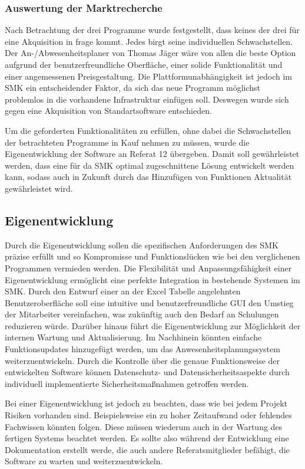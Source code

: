 \subsubsection{Auswertung der Marktrecherche}
\label{sec:AuswertungMarktrecherche}
Nach Betrachtung der drei Programme wurde festgestellt, dass keines der drei für eine Akquisition in frage kommt. Jedes birgt seine individuellen Schwachstellen. Der An-/Abwesenheitsplaner von Thomas Jäger wäre von allen die beste Option aufgrund der benutzerfreundliche Oberfläche, einer solide Funktionalität und einer angemessenen Preisgestaltung. Die Plattformunabhängigkeit ist jedoch im SMK ein entscheidender Faktor, da sich das neue Programm möglichst problemlos in die vorhandene Infrastruktur einfügen soll. Deswegen wurde sich gegen eine Akquisition von Standartsoftware entschieden.

Um die geforderten Funktionalitäten zu erfüllen, ohne dabei die Schwachstellen der betrachteten Programme in Kauf nehmen zu müssen, wurde die Eigenentwicklung der Software an Referat 12 übergeben. Damit soll gewährleistet werden, dass eine für da SMK optimal zugeschnittene Lösung entwickelt werden kann, sodass auch in Zukunft durch das Hinzufügen von Funktionen Aktualität gewährleistet wird.

\subsection{Eigenentwicklung}
\label{sec:Eigenentwicklung}

Durch die Eigenentwicklung sollen die spezifischen Anforderungen des SMK präzise erfüllt und so Kompromisse und Funktionslücken wie bei den verglichenen Programmen vermieden werden. Die Flexibilität und Anpassungsfähigkeit einer Eigenentwicklung ermöglicht eine perfekte Integration in bestehende Systemen im SMK. Durch den Entwurf einer an der Excel Tabelle angelehnten Benutzeroberfläche soll eine intuitive und benutzerfreundliche GUI den Umstieg der Mitarbeiter vereinfachen, was zukünftig auch den Bedarf an Schulungen reduzieren würde. Darüber hinaus führt die Eigenentwicklung zur Möglichkeit der internen Wartung und Aktualisierung. Im Nachhinein könnten einfache Funktionsupdates hinzugefügt werden, um das Anwesenheitsplanungssystem weiterzuentwickeln. Durch die Kontrolle über die genaue Funktionsweise der entwickelten Software können Datenschutz- und Datensicherheitsaspekte durch individuell implementierte Sicherheitsmaßnahmen getroffen werden.

Bei einer Eigenentwicklung ist jedoch zu beachten, dass wie bei jedem Projekt Risiken vorhanden sind. Beispielsweise ein zu hoher Zeitaufwand oder fehlendes Fachwissen könnten folgen. Diese müssen wiederum auch in der Wartung des fertigen Systems beachtet werden. Es sollte also während der Entwicklung eine Dokumentation erstellt werde, die auch andere Referatsmitglieder befähigt, die Software zu warten und \ggfs weiterzuentwickeln.


